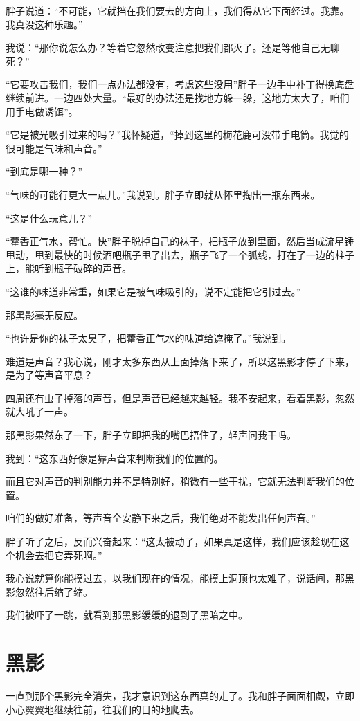胖子说道：“不可能，它就挡在我们要去的方向上，我们得从它下面经过。我靠。我真没这种乐趣。”

我说：“那你说怎么办？等着它忽然改变注意把我们都灭了。还是等他自己无聊死？”

“它要攻击我们，我们一点办法都没有，考虑这些没用”胖子一边手中补丁得换底盘继续前进。一边四处大量。“最好的办法还是找地方躲一躲，这地方太大了，咱们用手电做诱饵”。

“它是被光吸引过来的吗？”我怀疑道，“掉到这里的梅花鹿可没带手电筒。我觉的很可能是气味和声音。”

“到底是哪一种？”

“气味的可能行更大一点儿。”我说到。胖子立即就从怀里掏出一瓶东西来。

“这是什么玩意儿？”

“藿香正气水，帮忙。快”胖子脱掉自己的袜子，把瓶子放到里面，然后当成流星锤甩动，甩到最快的时候酒吧瓶子甩了出去，瓶子飞了一个弧线，打在了一边的柱子上，能听到瓶子破碎的声音。

“这谁的味道非常重，如果它是被气味吸引的，说不定能把它引过去。”

那黑影毫无反应。

“也许是你的袜子太臭了，把藿香正气水的味道给遮掩了。”我说到。

难道是声音？我心说，刚才太多东西从上面掉落下来了，所以这黑影才停了下来，是为了等声音平息？

四周还有虫子掉落的声音，但是声音已经越来越轻。我不安起来，看着黑影，忽然就大吼了一声。

那黑影果然东了一下，胖子立即把我的嘴巴捂住了，轻声问我干吗。

我到：“这东西好像是靠声音来判断我们的位置的。

而且它对声音的判别能力并不是特别好，稍微有一些干扰，它就无法判断我们的位置。

咱们的做好准备，等声音全安静下来之后，我们绝对不能发出任何声音。”

胖子听了之后，反而兴奋起来：“这太被动了，如果真是这样，我们应该趁现在这个机会去把它弄死啊。”

我心说就算你能摸过去，以我们现在的情况，能摸上洞顶也太难了，说话间，那黑影忽然往后缩了缩。

我们被吓了一跳，就看到那黑影缓缓的退到了黑暗之中。

\chapter{黑影}

一直到那个黑影完全消失，我才意识到这东西真的走了。我和胖子面面相觑，立即小心翼翼地继续往前，往我们的目的地爬去。

